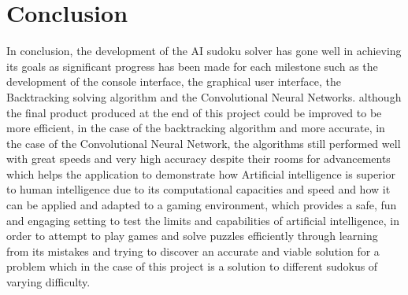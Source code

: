 \documentclass[]{final_report}
\begin{document}
\chapter{Conclusion}
In conclusion, the development of the AI sudoku solver has gone well in achieving its goals as significant progress has been made for each milestone such as the development of the console interface, the graphical user interface, the Backtracking solving algorithm and the Convolutional Neural Networks. although the final product produced at the end of this project could be improved to be more efficient, in the case of the backtracking algorithm and more accurate, in the case of the Convolutional Neural Network, the algorithms still performed well with great speeds and very high accuracy despite their rooms for advancements which helps the application to demonstrate how Artificial intelligence is superior to human intelligence due to its computational capacities and speed and how it can be applied and adapted to a gaming environment, which provides a safe, fun and engaging setting to test the limits and capabilities of artificial intelligence, in order to attempt to play games and solve puzzles efficiently through learning from its mistakes and trying to discover an accurate and viable solution for a problem which in the case of this project is a solution to different sudokus of varying difficulty.
\end{document}
